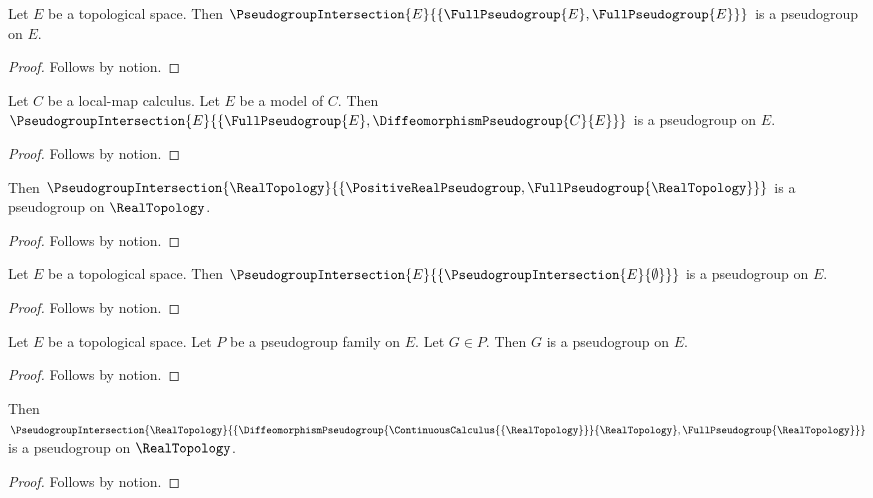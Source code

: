 



\begin{proposition}\label{nominal_full_pair}
    Let $E$ be a topological space.
    Then $\PseudogroupIntersection{E}{\{\FullPseudogroup{E},\FullPseudogroup{E}\}}$
        is a pseudogroup on $E$.
\end{proposition}
\begin{proof}
    Follows by notion.
\end{proof}

\begin{proposition}\label{nominal_full_diffeomorphism}
    Let $C$ be a local-map calculus.
    Let $E$ be a model of $C$.
    Then $\PseudogroupIntersection{E}{\{\FullPseudogroup{E},\DiffeomorphismPseudogroup{C}{E}\}}$
        is a pseudogroup on $E$.
\end{proposition}
\begin{proof}
    Follows by notion.
\end{proof}

\begin{proposition}\label{nominal_positive_full}
    Then $\PseudogroupIntersection{\RealTopology}{\{\PositiveRealPseudogroup,\FullPseudogroup{\RealTopology}\}}$
        is a pseudogroup on $\RealTopology$.
\end{proposition}
\begin{proof}
    Follows by notion.
\end{proof}

\begin{proposition}\label{nominal_empty_singleton_nested}
    Let $E$ be a topological space.
    Then $\PseudogroupIntersection{E}{\{\PseudogroupIntersection{E}{\emptyset}\}}$
        is a pseudogroup on $E$.
\end{proposition}
\begin{proof}
    Follows by notion.
\end{proof}

\begin{proposition}\label{nominal_family_member}
    Let $E$ be a topological space.
    Let $P$ be a pseudogroup family on $E$.
    Let $G\in P$.
    Then $G$ is a pseudogroup on $E$.
\end{proposition}
\begin{proof}
    Follows by notion.
\end{proof}

\begin{proposition}\label{nominal_closed_calculus_intersection}
    Then $\PseudogroupIntersection{\RealTopology}{\{\DiffeomorphismPseudogroup{\ContinuousCalculus{\{\RealTopology\}}}{\RealTopology},\FullPseudogroup{\RealTopology}\}}$
        is a pseudogroup on $\RealTopology$.
\end{proposition}
\begin{proof}
    Follows by notion.
\end{proof}
